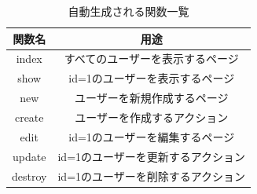 \documentclass{funthesis}
\begin{document}
\begin{table}[htb]
  \begin{center}
    \begin{tabular}{|c||c|} \hline
      関数名 & 用途  \\ \hline
      index	& すべてのユーザーを表示するページ \\ \hline
      show & id=1のユーザーを表示するページ\\ \hline
      new & ユーザーを新規作成するページ  \\ \hline
      	create & ユーザーを作成するアクション \\ \hline
      edit & id=1のユーザーを編集するページ\\ \hline
      update & id=1のユーザーを更新するアクション \\ \hline
      destroy & id=1のユーザーを削除するアクション \\ \hline
    \end{tabular}
  \end{center}
  \caption{自動生成される関数一覧}    \label{sample}
\end{table}
\end{document}
